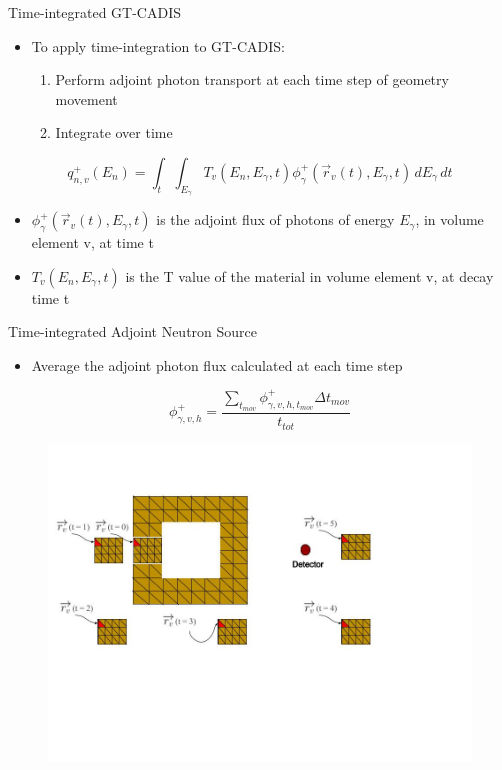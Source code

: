 \documentclass{beamer}
\begin{document}
\begin{frame}{Time-integrated GT-CADIS}
	\begin{itemize}
		\item{To apply time-integration to GT-CADIS:}
			\begin{enumerate}
				\item{Perform adjoint photon transport at each
					time step of geometry movement}
				\item{Integrate over time}
			\end{enumerate}
	\end{itemize}
  \begin{equation}\label{eq:adj_src_1_avg}
	 q_{n,v}^{+}(E_{n}) =
	 \int_{t}  \int_{E_{\gamma}}
	 T_{v}(E_n, E_{\gamma}, t) 
	 \phi_{\gamma}^{+}(\overrightarrow{r}_{v}(t), E_{\gamma},t)
	 \, dE_{\gamma} \, dt
  \end{equation}

\begin{itemize}
\item{$\phi_{\gamma}^{+}(\overrightarrow{r}_{v}(t), E_{\gamma},t) $ is the 
adjoint flux of photons of energy $E_{\gamma}$, in volume element v, at time t}
\item{$T_{v}(E_n, E_{\gamma}, t) $ is the T value of the material in volume
		element v, at decay time t}
\end{itemize}
\end{frame}

\begin{frame}{Time-integrated Adjoint Neutron Source}
	\begin{itemize}
		\item{Average the adjoint photon flux calculated at each time step}
	\end{itemize}
\begin{equation}\label{eq:sum}
	\phi_{\gamma,v, h}^{+} =
	\frac{\sum_{t_{mov}}{\phi_{\gamma,v,h,t_{mov}}^{+}}\Delta{t_{mov}}}
	{t_{tot}}
\end{equation}
        \begin{figure}
	\centering
		\hspace{1.6cm}
	\includegraphics[scale=0.30]{mesh_total.jpg}
	\end{figure}

\end{frame}
\end{document}
